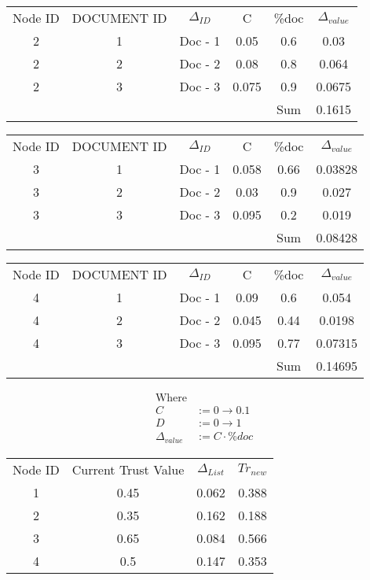 \begin{tabular}{c c c c c c}
Node ID &	DOCUMENT ID	&  \( \Delta_{ID} \)         & C	& \%doc& \( \Delta_{value} \) \\
2        &1	  & Doc - 1         & 0.05       & 0.6	& 0.03 \\
2        &2	  & Doc - 2         & 0.08       & 0.8	& 0.064 \\
2        &3	  & Doc - 3         & 0.075      & 0.9	& 0.0675 \\
	     &	  &    	            &            &Sum	& 0.1615
 \end{tabular}

\begin{tabular}{c c c c c c}
Node ID &	DOCUMENT ID	&  \( \Delta_{ID} \)         & C	& \%doc	& \( \Delta_{value} \)
\\
3        &1	  & Doc - 1         & 0.058      & 0.66	& 0.03828 \\
3        &2	  & Doc - 2         & 0.03       & 0.9	& 0.027 \\
3        &3	  & Doc - 3         & 0.095      & 0.2	& 0.019 \\
      	 & 	  &                 &            & Sum	& 0.08428
\end{tabular}

\begin{tabular}{c c c c c c}
Node ID &	DOCUMENT ID	&  \( \Delta_{ID} \)         & C	& \%doc	 & \( \Delta_{value} \)
\\
4        &1	  & Doc - 1         & 0.09       & 0.6	& 0.054 \\
4        &2	  & Doc - 2         & 0.045      & 0.44	& 0.0198 \\
4        &3	  & Doc - 3         & 0.095      & 0.77	& 0.07315 \\
	     &    &                 &            &	Sum	& 0.14695
\end{tabular}

\begin{align*}
    \text{Where}& \\
    C &:= 0 \to 0.1 \\
    D &:= 0 \to 1 \\
    \Delta_{value} &:= C \cdot \%doc
\end{align*}

\begin{tabular}{c c c c}
    Node ID	& Current Trust Value &	\( \Delta_{List} \) &	\( Tr_{new} \)  \\
1       & 0.45                & 0.062    &    0.388 \\
2       & 0.35                & 0.162    &    0.188 \\
3       & 0.65                & 0.084    &    0.566 \\
4       & 0.5                 & 0.147    &    0.353 \\
\end{tabular}

